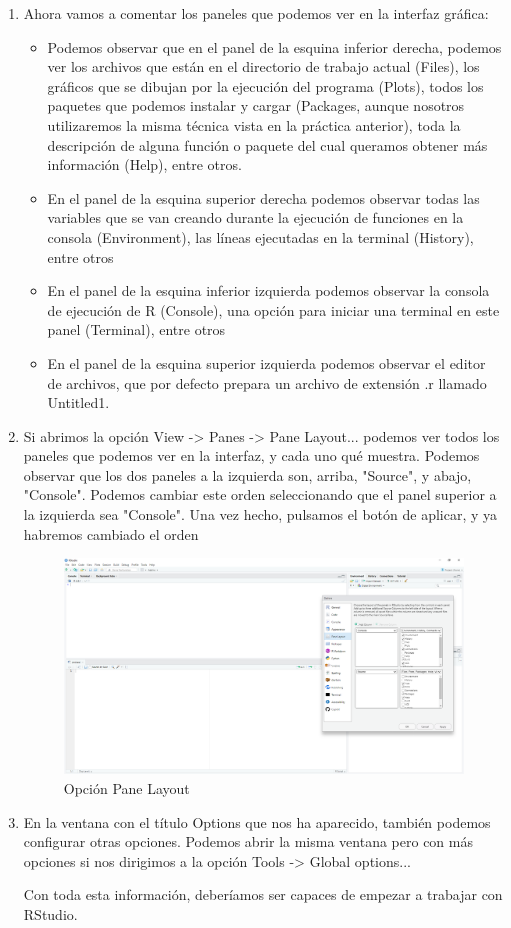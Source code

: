 \documentclass[parskip=full]{scrartcl}
\begin{document}
\begin{enumerate}
\item
Ahora vamos a comentar los paneles que podemos ver en la interfaz gráfica:

\begin{itemize}
\item
Podemos observar que en el panel de la esquina inferior derecha, podemos ver los archivos que están en el directorio de trabajo actual (Files), los gráficos que se dibujan por la ejecución del programa (Plots), todos los paquetes que podemos instalar y cargar (Packages, aunque nosotros utilizaremos la misma técnica vista en la práctica anterior), toda la descripción de alguna función o paquete del cual queramos obtener más información (Help), entre otros.
\item
En el panel de la esquina superior derecha podemos observar todas las variables que se van creando durante la ejecución de funciones en la consola (Environment), las líneas ejecutadas en la terminal (History), entre otros
\item
En el panel de la esquina inferior izquierda podemos observar la consola de ejecución de R (Console), una opción para iniciar una terminal en este panel (Terminal), entre otros
\item
En el panel de la esquina superior izquierda podemos observar el editor de archivos, que por defecto prepara un archivo de extensión .r llamado Untitled1.
\end{itemize}

\item 
Si abrimos la opción View -> Panes -> Pane Layout... podemos ver todos los paneles que podemos ver en la interfaz, y cada uno qué muestra. Podemos observar que los dos paneles a la izquierda son, arriba, "Source", y abajo, "Console". Podemos cambiar este orden seleccionando que el panel superior a la izquierda sea "Console". Una vez hecho, pulsamos el botón de aplicar, y ya habremos cambiado el orden
\begin{figure}[H]
\centering
\includegraphics[width=0.7\linewidth]{images/imagen3.png}
\caption{\label{fig:rstudio_pane_layout}Opción Pane Layout}
\end{figure}

\item
En la ventana con el título Options que nos ha aparecido, también podemos configurar otras opciones. Podemos abrir la misma ventana pero con más opciones si nos dirigimos a la opción Tools -> Global options...

Con toda esta información, deberíamos ser capaces de empezar a trabajar con RStudio.

\end{enumerate}
\end{document}
